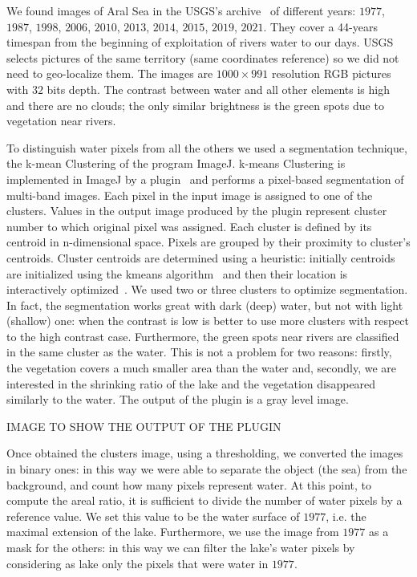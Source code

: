We found images of Aral Sea in the USGS’s archive~\cite{images} of different years: $1977$, $1987$, $1998$, $2006$, $2010$, $2013$, $2014$, $2015$, $2019$, $2021$. 
They cover a 44-years timespan from the beginning of exploitation of rivers water to our days. 
USGS selects pictures of the same territory (same coordinates reference) so we did not need to geo-localize them. 
The images are $1000 \times 991$ resolution RGB pictures with $32$ bits depth. 
The contrast between water and all other elements is high and there are no clouds; the only similar brightness is the green spots due to vegetation near rivers. 

To distinguish water pixels from all the others we used a segmentation technique, the k-mean Clustering of the program ImageJ. 
k-means Clustering is implemented in ImageJ by a plugin~\cite{plugin} and performs a pixel-based segmentation of multi-band images. 
Each pixel in the input image is assigned to one of the clusters. 
Values in the output image produced by the plugin represent cluster number to which original pixel was assigned. 
Each cluster is defined by its centroid in n-dimensional space. 
Pixels are grouped by their proximity to cluster's centroids. 
Cluster centroids are determined using a heuristic: initially centroids are initialized using the kmeans algorithm~\cite{kmeans} and then their location is interactively optimized~\cite{plugin}.
We used two or three clusters to optimize segmentation. 
In fact, the segmentation works great with dark (deep) water, but not with light (shallow) one: when the contrast is low is better to use more clusters with respect to the high contrast case. 
Furthermore, the green spots near rivers are classified in the same cluster as the water. 
This is not a problem for two reasons: firstly, the vegetation covers a much smaller area than the water and, secondly, we are interested in the shrinking ratio of the lake and the vegetation disappeared similarly to the water. 
The output of the plugin is a gray level image. 

IMAGE TO SHOW THE OUTPUT OF THE PLUGIN 

Once obtained the clusters image, using a thresholding, we converted the images in binary ones: in this way we were able to separate the object (the sea) from the background, and count how many pixels represent water. 
At this point, to compute the areal ratio, it is sufficient to divide the number of water pixels by a reference value. 
We set this value to be the water surface of $1977$, i.e. the maximal extension of the lake. 
Furthermore, we use the image from $1977$ as a mask for the others: in this way we can filter the lake’s water pixels by considering as lake only the pixels that were water in $1977$. 

